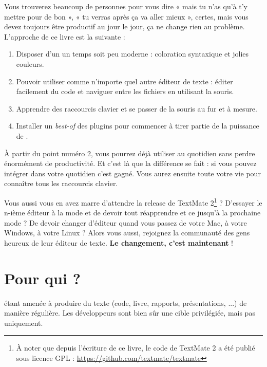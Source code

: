 Vous trouverez beaucoup de personnes pour vous dire « mais tu n'as qu'à t'y mettre pour de bon », « tu verras après ça va aller mieux », certes, mais vous devez toujours être productif au jour le jour, ça ne change rien au problème. L'approche de ce livre est la suivante :

\begin{enumerate}
    \item Disposer d'un \vim un temps soit peu moderne : coloration syntaxique et jolies couleurs.
    \item Pouvoir utiliser \vim comme n'importe quel autre éditeur de texte : éditer facilement du code et naviguer entre les fichiers en utilisant la souris.
    \item Apprendre des raccourcis clavier et se passer de la souris au fur et à mesure.
    \item Installer un \emph{best-of} des plugins pour commencer à tirer partie de la puissance de \vim.
\end{enumerate}

À partir du point numéro 2, vous pourrez déjà utiliser \vim au quotidien sans perdre énormément de productivité. Et c'est là que la différence se fait : si vous pouvez intégrer \vim dans votre quotidien c'est gagné. Vous aurez ensuite toute votre vie pour connaître tous les raccourcis clavier.

Vous aussi vous en avez marre d'attendre la release de TextMate 2\footnote{À noter que depuis l'écriture de ce livre, le code de TextMate 2 a été publié sous licence GPL : \url{https://github.com/textmate/textmate}} ? D'essayer le n-ième éditeur à la mode et de devoir tout réapprendre et ce jusqu'à la prochaine mode ? De devoir changer d'éditeur quand vous passez de votre Mac, à votre Windows, à votre Linux ? Alors vous aussi, rejoignez la communauté des gens heureux de leur éditeur de texte. \textbf{Le changement, c'est maintenant} !

\section{Pour qui ?}

 étant amenée à produire du texte (code, livre, rapports, présentations, ...) de manière régulière. Les développeurs sont bien sûr une cible privilégiée, mais pas uniquement.

